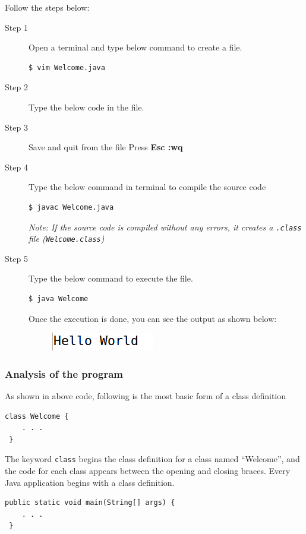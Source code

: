 \documentclass[11pt,a4paper]{article}
\begin{document}
Follow the steps below:
\begin{description}
\item [Step 1]
 Open a terminal and type below command to create a file.
\begin{lstlisting}[numbers=none]
$ vim Welcome.java
\end{lstlisting}
\item [Step 2]
 Type the below code in the file.

\item [Step 3] Save and quit from the file 
   Press \textbf{Esc :wq}
\item [Step 4] Type the below command in terminal to compile the source code 
\begin{lstlisting}[numbers=none]
$ javac Welcome.java
\end{lstlisting}

 \emph{Note: If the source code is compiled without any errors, it creates a \texttt{.class} file (\texttt{Welcome.class})}
 \item [Step 5] Type the below command to execute the file.

\begin{lstlisting}[numbers=none]
$ java Welcome
\end{lstlisting}

Once the execution is done, you can see the output as shown below:
 \begin{figure}[H]
 \begin{center}
   \includegraphics[scale=0.5]{Welcome.png}
 \end{center}
 \end{figure}
\end{description}

\subsubsection*{Analysis of the program}

As shown in above code, following is the most basic form of a class definition
\begin{lstlisting}[numbers=none]
 class Welcome {
    . . .
 }
\end{lstlisting}

The keyword \lstinline!class! begins the class definition for a class named ``Welcome'', and the code for each class appears between the opening and closing braces. Every Java application begins with a class definition.
\begin{lstlisting}[numbers=none]
 public static void main(String[] args) {
    . . .
 }
\end{lstlisting}
\end{document}
